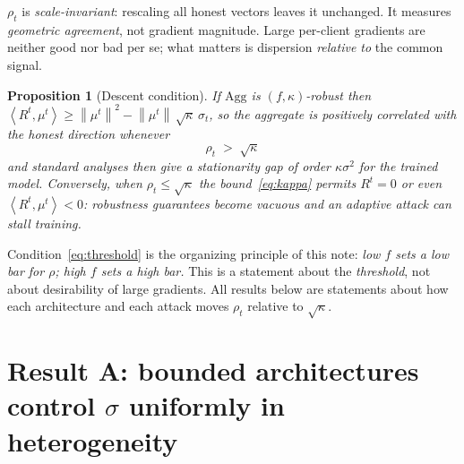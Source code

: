 \documentclass[11pt]{article}
\newtheorem{proposition}{Proposition}
\newcommand{\norm}[1]{\left\lVert #1 \right\rVert}
\newcommand{\inner}[2]{\left\langle #1, #2 \right\rangle}
\newcommand{\agg}{\mathrm{Agg}}
\begin{document}
$\rho_t$ is \emph{scale-invariant}: rescaling all honest vectors leaves it
unchanged. It measures \emph{geometric agreement}, not gradient magnitude.
Large per-client gradients are neither good nor bad per se; what matters is
dispersion \emph{relative to} the common signal.

\begin{proposition}[Descent condition]
\label{prop:descent}
If $\agg$ is $(f,\kappa)$-robust then
$\inner{R^t}{\mu^t} \ge \norm{\mu^t}^2 - \norm{\mu^t}\,\sqrt{\kappa}\,\sigma_t$,
so the aggregate is positively correlated with the honest direction whenever
\begin{equation}
\boxed{\;\rho_t \;>\; \sqrt{\kappa}\;}
\label{eq:threshold}
\end{equation}
and standard analyses then give a stationarity gap of order
$\kappa\sigma^2$ for the trained model. Conversely, when
$\rho_t \le \sqrt{\kappa}$ the bound~\eqref{eq:kappa} permits $R^t = 0$ or even
$\inner{R^t}{\mu^t} < 0$: robustness guarantees become vacuous and an adaptive
attack can stall training.
\end{proposition}

Condition~\eqref{eq:threshold} is the organizing principle of this note:
\emph{low $f$ sets a low bar for $\rho$; high $f$ sets a high bar.} This is a
statement about the \emph{threshold}, not about desirability of large
gradients. All results below are statements about how each architecture and
each attack moves $\rho_t$ relative to $\sqrt{\kappa}$.

\section{Result A: bounded architectures control $\sigma$ uniformly in heterogeneity}
\end{document}
